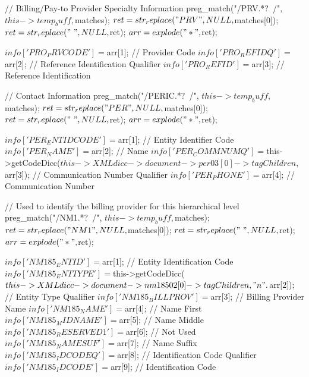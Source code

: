 \begin{DoxyCode}
                                     {
                // Billing/Pay-to Provider Specialty Information
                preg_match("/PRV.*?~/", $this->temp_buff, $matches);
                $ret = str_replace("PRV", NULL, $matches[0]);
                $ret = str_replace("~", NULL, $ret);
                $arr = explode("*", $ret);
                
                $info['PRO_PRVCODE']    = $arr[1];      // Provider Code
                $info['PRO_REFIDQ']     = $arr[2];      // Reference
       Identification Qualifier
                $info['PRO_REFID']              = $arr[3];      // Reference
       Identification
                
                // Contact Information
                preg_match("/PER\*IC.*?~/", $this->temp_buff, $matches);
                $ret = str_replace("PER", NULL, $matches[0]);
                $ret = str_replace("~", NULL, $ret);
                $arr = explode("*", $ret);
                
                $info['PER_ENTIDCODE']  = $arr[1];      // Entity Identifier
       Code
                $info['PER_NAME']               = $arr[2];      // Name
                $info['PER_COMMNUMQ']   = $this->getCodeDicc($this->XMLdicc->
      document->per03[0]->tagChildren, $arr[3]); // Communication Number Qualifier
                $info['PER_PHONE']              = $arr[4];      //
       Communication Number
                
                // Used to identify the billing provider for this hierarchical
       level
                preg_match("/NM1.*?~/", $this->temp_buff, $matches);
                $ret = str_replace("NM1", NULL, $matches[0]);
                $ret = str_replace("~", NULL, $ret);
                $arr = explode("*", $ret);

                $info['NM185_ENTID']    = $arr[1];      // Entity
       Identification Code
                $info['NM185_ENTTYPE']  = $this->getCodeDicc($this->XMLdicc->
      document->nm18502[0]->tagChildren, "n".$arr[2]);   // Entity Type Qualifier
                $info['NM185_BILLPROV'] = $arr[3];      // Billing Provider
       Name
                $info['NM185_NAME']     = $arr[4];      // Name First
                $info['NM185_MIDNAME']  = $arr[5];      // Name Middle
                $info['NM185_RESERVED1']= $arr[6];      // Not Used
                $info['NM185_NAMESUF']  = $arr[7];      // Name Suffix
                $info['NM185_IDCODEQ']  = $arr[8];      // Identification Code
       Qualifier
                $info['NM185_IDCODE']   = $arr[9];      // Identification Code
                
}
\end{DoxyCode}
